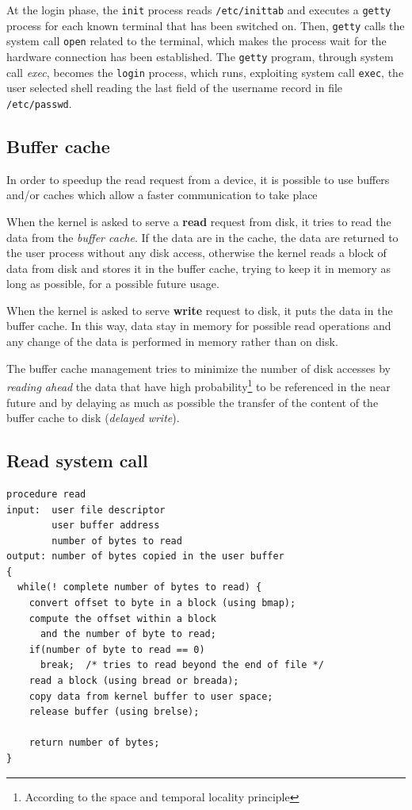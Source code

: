 At the login phase, the \texttt{init} process reads \texttt{/etc/inittab} and executes a \texttt{getty} process for each known terminal that has been switched on. Then, \texttt{getty} calls the system call \texttt{open} related to the terminal, which makes the process wait for the hardware connection has been established. The \texttt{getty} program, through system call \emph{exec}, becomes the \texttt{login} process, which runs, exploiting system call \texttt{exec}, the user selected shell reading the last field of the username record in file \texttt{/etc/passwd}.

\subsection{Buffer cache}
In order to speedup the read request from a device, it is possible to use buffers and/or caches which allow a faster communication to take place

When the kernel is asked to serve a \textbf{read} request from disk, it tries to read the data from the \emph{buffer cache}. If the data are in the cache, the data are returned to the user process without any disk access, otherwise the kernel reads a block of data from disk and stores it in the buffer cache, trying to keep it in memory as long as possible, for a possible future usage.

When the kernel is asked to serve \textbf{write} request to disk, it puts the data in the buffer cache. In this way, data stay in memory for possible read operations and any change of the data is performed in memory rather than on disk.

The buffer cache management tries to minimize the number of disk accesses by \emph{reading ahead} the data that have high probability\footnote{According to the space and temporal locality principle} to be referenced in the near future and by delaying as much as possible the transfer of the content of the buffer cache to disk (\emph{delayed write}).

\subsection*{Read system call}
\begin{verbatim}
procedure read
input:  user file descriptor
        user buffer address
        number of bytes to read
output: number of bytes copied in the user buffer
{
  while(! complete number of bytes to read) {
    convert offset to byte in a block (using bmap);
    compute the offset within a block
      and the number of byte to read;
    if(number of byte to read == 0)
      break;  /* tries to read beyond the end of file */
    read a block (using bread or breada);
    copy data from kernel buffer to user space;
    release buffer (using brelse);
    
    return number of bytes; 
}
\end{verbatim}

